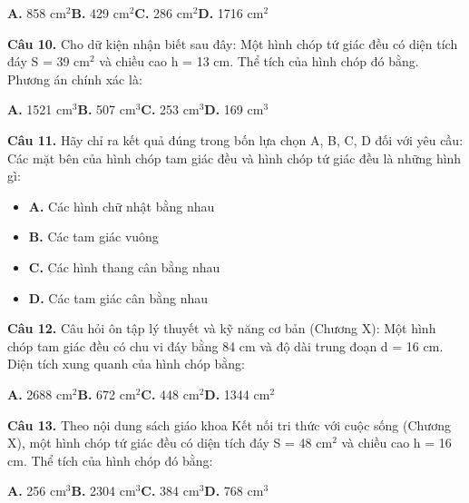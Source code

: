 \documentclass[11pt,a4paper]{article}
\begin{document}
\hspace*{1.5em}\textbf{A.} 858 cm$^2$\quad\quad \textbf{B.} 429 cm$^2$\quad\quad \textbf{C.} 286 cm$^2$\quad\quad \textbf{D.} 1716 cm$^2$\par\vspace{2pt}
\textbf{\color{primary} Câu 10.} Cho dữ kiện nhận biết sau đây: Một hình chóp tứ giác đều có diện tích đáy S = 39 cm$^2$ và chiều cao h = 13 cm. Thể tích của hình chóp đó bằng. Phương án chính xác là:\par
\hspace*{1.5em}\textbf{A.} 1521 cm$^3$\quad\quad \textbf{B.} 507 cm$^3$\quad\quad \textbf{C.} 253 cm$^3$\quad\quad \textbf{D.} 169 cm$^3$\par\vspace{2pt}
\textbf{\color{primary} Câu 11.} Hãy chỉ ra kết quả đúng trong bốn lựa chọn A, B, C, D đối với yêu cầu: Các mặt bên của hình chóp tam giác đều và hình chóp tứ giác đều là những hình gì:\par
\begin{itemize}\setlength{\itemsep}{1pt}\setlength{\parskip}{0pt}
  \item[] \textbf{A.} Các hình chữ nhật bằng nhau
  \item[] \textbf{B.} Các tam giác vuông
  \item[] \textbf{C.} Các hình thang cân bằng nhau
  \item[] \textbf{D.} Các tam giác cân bằng nhau
\end{itemize}\vspace{2pt}
\textbf{\color{primary} Câu 12.} Câu hỏi ôn tập lý thuyết và kỹ năng cơ bản (Chương X): Một hình chóp tam giác đều có chu vi đáy bằng 84 cm và độ dài trung đoạn d = 16 cm. Diện tích xung quanh của hình chóp bằng:\par
\hspace*{1.5em}\textbf{A.} 2688 cm$^2$\quad\quad \textbf{B.} 672 cm$^2$\quad\quad \textbf{C.} 448 cm$^2$\quad\quad \textbf{D.} 1344 cm$^2$\par\vspace{2pt}
\textbf{\color{primary} Câu 13.} Theo nội dung sách giáo khoa Kết nối tri thức với cuộc sống (Chương X), một hình chóp tứ giác đều có diện tích đáy S = 48 cm$^2$ và chiều cao h = 16 cm. Thể tích của hình chóp đó bằng:\par
\hspace*{1.5em}\textbf{A.} 256 cm$^3$\quad\quad \textbf{B.} 2304 cm$^3$\quad\quad \textbf{C.} 384 cm$^3$\quad\quad \textbf{D.} 768 cm$^3$\par\vspace{2pt}
\end{document}
